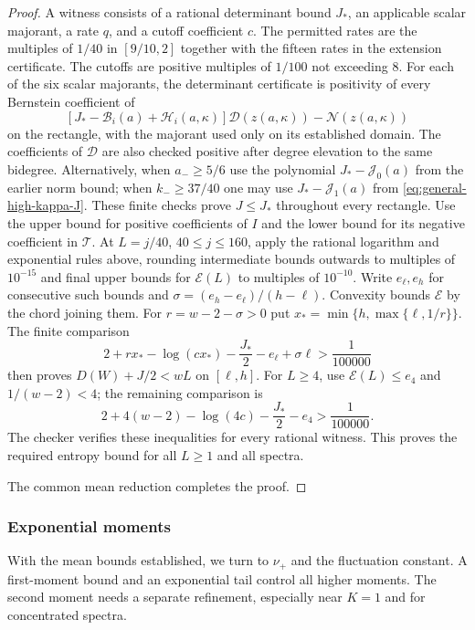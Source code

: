 \documentclass[11pt,a4paper]{article}
\numberwithin{equation}{section}
\begin{document}
\begin{proof}
A witness consists of a rational determinant bound $J_*$, an applicable
scalar majorant, a rate $q$, and a cutoff coefficient $c$.
The permitted rates are the multiples of $1/40$ in $[9/10,2]$ together
with the fifteen rates in the extension certificate.
The cutoffs are positive multiples of $1/100$ not exceeding $8$.
For each of the six scalar majorants, the determinant certificate is
positivity of every Bernstein coefficient of
\[
 [J_*-\mathcal B_i(a)+\mathcal H_i(a,\kappa)]
       \mathcal D(z(a,\kappa))-\mathcal N(z(a,\kappa))
\]
on the rectangle, with the majorant used only on its established domain.
The coefficients of $\mathcal D$ are also checked positive after degree
elevation to the same bidegree.
Alternatively, when $a_-\ge5/6$ use the polynomial
$J_*-\mathcal J_0(a)$ from the earlier norm bound;
when $k_-\ge37/40$ one may use
$J_*-\mathcal J_1(a)$ from \eqref{eq:general-high-kappa-J}.
These finite checks prove $J\le J_*$ throughout every rectangle.
Use the upper bound for positive coefficients of $I$ and the lower bound
for its negative coefficient in $\mathcal T$.
At $L=j/40$, $40\le j\le160$, apply the rational logarithm and exponential
rules above, rounding intermediate bounds outwards
to multiples of $10^{-15}$ and final upper bounds for $\mathcal E(L)$
to multiples of $10^{-10}$.
Write $e_\ell,e_h$ for consecutive such bounds and
$\sigma=(e_h-e_\ell)/(h-\ell)$.
Convexity bounds $\mathcal E$ by the chord joining them.
For $r=w-2-\sigma>0$ put
$x_*=\min\{h,\max\{\ell,1/r\}\}$.
The finite comparison
\[
 2+rx_* -\log(cx_*)-\frac{J_*}{2}-e_\ell+\sigma\ell
 >\frac1{100000}
\]
then proves $D(W)+J/2<wL$ on $[\ell,h]$.
For $L\ge4$, use $\mathcal E(L)\le e_4$ and $1/(w-2)<4$;
the remaining comparison is
\[
 2+4(w-2)-\log(4c)-\frac{J_*}{2}-e_4>\frac1{100000}.
\]
The checker verifies these inequalities for every rational witness.
This proves the required entropy bound for all $L\ge1$ and all spectra.

The common mean reduction completes the proof.
\end{proof}

\subsubsection{Exponential moments}
With the mean bounds established, we turn to $\nu_+$ and the fluctuation
constant. A first-moment bound and an exponential tail control all higher
moments. The second moment needs a separate refinement, especially near
$K=1$ and for concentrated spectra.
\end{document}
